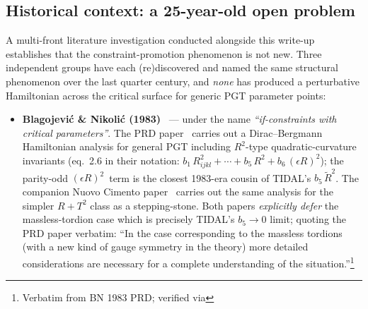 \subsection{Historical context: a 25-year-old open problem}
\label{sec:pr-cb-history}

A multi-front literature investigation conducted alongside this write-up
establishes that the constraint-promotion phenomenon is not new.  Three
independent groups have each (re)discovered and named the same structural
phenomenon over the last quarter century, and \emph{none} has produced a
perturbative Hamiltonian across the critical surface for generic PGT
parameter points:

\begin{itemize}
  \item \textbf{Blagojevi\'c \& Nikoli\'c (1983)}~\cite{BlagojevicNikolic1983,BlagojevicNikolic1983Nuovo}
    --- under the name \emph{``if-constraints with critical parameters''}.
    The PRD paper~\cite{BlagojevicNikolic1983} carries out a Dirac--Bergmann
    Hamiltonian analysis for general PGT including $R^2$-type quadratic-curvature
    invariants (eq.~2.6 in their notation: $b_1\,R^2_{ijkl} + \cdots + b_5\,R^2 +
    b_6\,(\epsilon R)^2$); the parity-odd $(\epsilon R)^2$~term is the closest
    1983-era cousin of TIDAL's $b_5\,\tilde{R}^2$.  The companion Nuovo Cimento
    paper~\cite{BlagojevicNikolic1983Nuovo} carries out the same analysis for the
    simpler $R + T^2$ class as a stepping-stone.  Both papers \emph{explicitly
    defer} the massless-tordion case which is precisely TIDAL's $b_5 \to 0$
    limit; quoting the PRD paper verbatim: ``In the case corresponding to the
    massless tordions (with a new kind of gauge symmetry in the theory) more
    detailed considerations are necessary for a complete understanding of the
    situation.''\footnote{Verbatim from BN 1983 PRD; verified via
}
\end{itemize}

